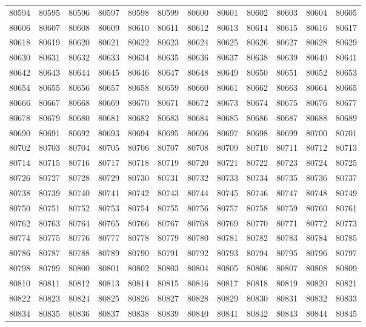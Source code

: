 \begin{center}
\begin{longtable}{llllllllllll}
80594 &80595 &80596 &80597 &80598 &80599 &80600 &80601 &80602 &80603 &80604 &80605 \\
80606 &80607 &80608 &80609 &80610 &80611 &80612 &80613 &80614 &80615 &80616 &80617 \\
80618 &80619 &80620 &80621 &80622 &80623 &80624 &80625 &80626 &80627 &80628 &80629 \\
80630 &80631 &80632 &80633 &80634 &80635 &80636 &80637 &80638 &80639 &80640 &80641 \\
80642 &80643 &80644 &80645 &80646 &80647 &80648 &80649 &80650 &80651 &80652 &80653 \\
80654 &80655 &80656 &80657 &80658 &80659 &80660 &80661 &80662 &80663 &80664 &80665 \\
80666 &80667 &80668 &80669 &80670 &80671 &80672 &80673 &80674 &80675 &80676 &80677 \\
80678 &80679 &80680 &80681 &80682 &80683 &80684 &80685 &80686 &80687 &80688 &80689 \\
80690 &80691 &80692 &80693 &80694 &80695 &80696 &80697 &80698 &80699 &80700 &80701 \\
80702 &80703 &80704 &80705 &80706 &80707 &80708 &80709 &80710 &80711 &80712 &80713 \\
80714 &80715 &80716 &80717 &80718 &80719 &80720 &80721 &80722 &80723 &80724 &80725 \\
80726 &80727 &80728 &80729 &80730 &80731 &80732 &80733 &80734 &80735 &80736 &80737 \\
80738 &80739 &80740 &80741 &80742 &80743 &80744 &80745 &80746 &80747 &80748 &80749 \\
80750 &80751 &80752 &80753 &80754 &80755 &80756 &80757 &80758 &80759 &80760 &80761 \\
80762 &80763 &80764 &80765 &80766 &80767 &80768 &80769 &80770 &80771 &80772 &80773 \\
80774 &80775 &80776 &80777 &80778 &80779 &80780 &80781 &80782 &80783 &80784 &80785 \\
80786 &80787 &80788 &80789 &80790 &80791 &80792 &80793 &80794 &80795 &80796 &80797 \\
80798 &80799 &80800 &80801 &80802 &80803 &80804 &80805 &80806 &80807 &80808 &80809 \\
80810 &80811 &80812 &80813 &80814 &80815 &80816 &80817 &80818 &80819 &80820 &80821 \\
80822 &80823 &80824 &80825 &80826 &80827 &80828 &80829 &80830 &80831 &80832 &80833 \\
80834 &80835 &80836 &80837 &80838 &80839 &80840 &80841 &80842 &80843 &80844 &80845 \\

\end{longtable}
\end{center}
